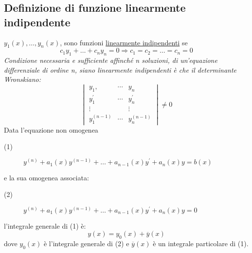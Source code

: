 \subsection{Definizione di funzione linearmente indipendente}
$y_1(x),\dots,y_n(x)$, sono funzioni \underline{linearmente indipendenti} se
\begin{equation*}
	c_1y_1+\dots+c_ny_n=0\Rightarrow c_1=c_2=\dots=c_n=0
\end{equation*}
\textit{Condizione necessaria e sufficiente affinché n soluzioni, di un'equazione differenziale di ordine n, siano linearmente indipendenti è che il determinante Wronskiano:}
\begin{equation*}
	\begin{vmatrix}
		y_1,&\cdots&y_n\\
		y_1^\prime&\cdots&y^\prime_n\\
		\vdots&&\vdots\\
		y_1^{(n-1)}&\cdots&y_n^{(n-1)}
	\end{vmatrix}\neq 0
\end{equation*}
Data l'equazione non omogenea
\begin{description}
	\item[(1) ] $y^{(n)}+a_1(x)y^{(n-1)}+\dots+a_{n-1}(x)y^\prime+a_n(x)y=b(x)$ 
\end{description}
e la sua omogenea associata:
\begin{description}
	\item[(2) ] $y^{(n)}+a_1(x)y^{(n-1)}+\dots+a_{n-1}(x)y^\prime+a_n(x)y=0$  
\end{description}
l'integrale generale di (1) è:
\begin{equation*}
	y(x)=y_0(x)+\overline{y}(x)
\end{equation*}
dove $y_0(x)$ è l'integrale generale di (2) e $\overline{y}(x)$ è un integrale particolare di (1).
